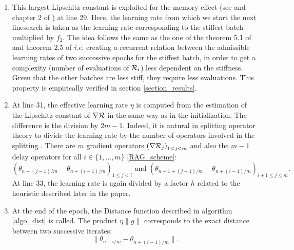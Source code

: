 \begin{enumerate}
	\item This largest Lipschitz constant is exploited for the memory effect (see \cite{Lyap_Theory_Bilel,Bilel_ICML} and chapter 2 of \cite{Bilel_thesis}) at line 29. Here, the learning rate from
          which we start the next linesearch is taken as the learning rate corresponding to the stiffest batch multiplied by $f_2$. The idea follows the same as the one of the
          theorem 5.1 of \cite{Bilel_ICML} and theorem 2.5 of \cite{Bilel_thesis} {\it i.e.} creating a recurrent relation between the admissible learning rates of two successive
          epochs for the stiffest batch, in order to get a complexity (number of evaluations of $\mathcal{R}_i$) less dependent on the stiffness. Given that the other batches are less
          stiff, they require less evaluations. This property is empirically verified in section \ref{section_results}.
	\item At line 31, the effective learning rate $\eta$ is computed from the estimation of the Lipschitz constant of $\nabla \mathcal{R}$ in the same way as in the initialization. %
          The difference is the division by $2m-1$. Indeed, it is natural in splitting operator theory to divide the learning rate by the number of operators involved in the splitting \cite{splitting_ode_review}. There are $m$ gradient operators $\left(\nabla \mathcal{R}_j\right)_{1 \leq j \leq m}$ and also the $m-1$ delay operators for all $i \in \{1,\dots,m\}$ \eqref{RAG_scheme}:
	\begin{equation*}
		\left(\theta_{n+(j-1)/m}-\theta_{n+(i-1)/m}\right)_{1\leq j <i} \text{ and } \left(\theta_{n-1+(j-1)/m}-\theta_{n+(i-1)/m}\right)_{i+1\leq j \leq m}.
	\end{equation*}
        At line 33, the learning rate is again divided by a factor $h$ related to the heuristic described later in the paper. 
	\item At the end of the epoch, the Distance function described in algorithm \ref{algo_dist} is called. 
          The product $\eta \|g\|$ corresponds to the exact distance between two successive iterates:
	\begin{equation*}
		\|\theta_{n+i/m}-\theta_{n+(i-1)/m}\|.

\end{equation*}
\end{enumerate}
